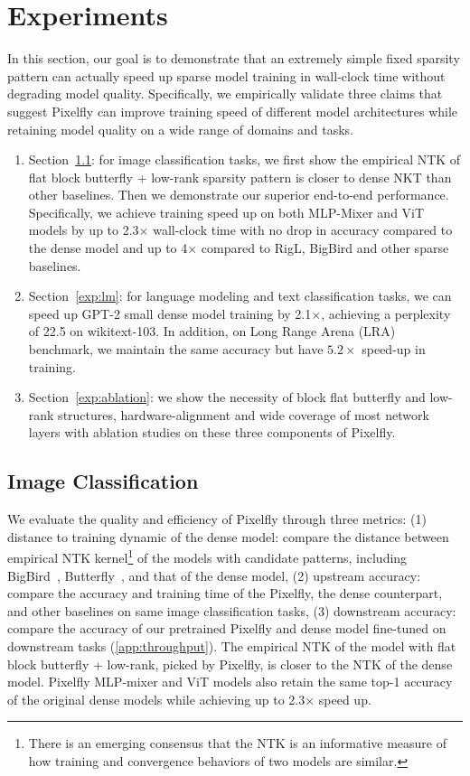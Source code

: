\section{Experiments}
\label{sec:experiments}

In this section, our goal is to demonstrate that an extremely simple fixed sparsity pattern can actually speed up sparse model training in wall-clock time without degrading model quality. Specifically, we empirically validate three claims that suggest Pixelfly can improve training speed of different model architectures while retaining model quality on a wide range of domains and tasks.

\begin{enumerate}[leftmargin=*,nosep,nolistsep]
  \item Section~\ref{exp:image}: for image classification tasks, we first show the empirical NTK of flat block butterfly + low-rank sparsity pattern is closer to dense NKT than other baselines. Then we demonstrate our superior end-to-end performance. Specifically, we achieve training speed up on both MLP-Mixer and ViT models by up to 2.3$\times$ wall-clock time with no drop in accuracy compared to the dense model and up to 4$\times$ compared to RigL, BigBird and other sparse baselines.
  \item Section~\ref{exp:lm}: for language modeling and text classification tasks, we can speed up GPT-2 small dense model training by 2.1$\times$, achieving a perplexity of 22.5 on wikitext-103. In addition, on Long Range Arena (LRA) benchmark, we maintain the same accuracy but have $5.2\times$ speed-up in training.
  \item Section~\ref{exp:ablation}: we show the necessity of block flat butterfly and low-rank structures, hardware-alignment and wide coverage of most network layers with ablation studies on these three components of Pixelfly.
 \end{enumerate}

\subsection{Image Classification}
\label{exp:image}

We evaluate the quality and efficiency of Pixelfly through three metrics: (1) distance to training dynamic of the dense model: compare the distance between empirical NTK kernel\footnote{There is an emerging consensus that the NTK is an informative measure of how training and convergence behaviors of two models are similar.} of the models with candidate patterns, including BigBird~\citep{zaheer2020bigbird}, Butterfly~\citep{dao2020kaleidoscope}, and that of the dense model, (2) upstream accuracy: compare the accuracy and training time of the Pixelfly, the dense counterpart, and other baselines on same image classification tasks, (3) downstream accuracy: compare the accuracy of our pretrained Pixelfly and dense model fine-tuned on downstream tasks (\ref{app:throughput}). The empirical NTK of the model with flat block butterfly + low-rank, picked by Pixelfly, is closer to the NTK of the dense model. Pixelfly MLP-mixer and ViT models also retain the same top-1 accuracy of the original dense models while achieving up to 2.3$\times$ speed up.

